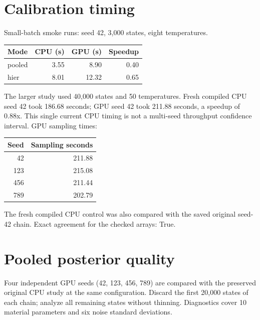 \documentclass[11pt]{article}
\begin{document}
\section*{Calibration timing}
Small-batch smoke runs: seed 42, 3,000 states, eight temperatures.
\begin{center}\begin{tabular}{lrrr}\toprule
Mode & CPU (s) & GPU (s) & Speedup\\\midrule
pooled & 3.55 & 8.90 & 0.40\\
hier & 8.01 & 12.32 & 0.65\\
\bottomrule\end{tabular}\end{center}
The larger study used 40,000 states and 50 temperatures. Fresh compiled CPU
seed 42 took 186.68 seconds; GPU seed 42 took 211.88 seconds,
a speedup of 0.88x. This single current CPU timing is not a multi-seed
throughput confidence interval. GPU sampling times:
\begin{center}\begin{tabular}{rr}\toprule
Seed & Sampling seconds\\\midrule
42 & 211.88\\
123 & 215.08\\
456 & 211.44\\
789 & 202.79\\
\bottomrule\end{tabular}\end{center}
The fresh compiled CPU control was also compared with the saved original seed-42
chain. Exact agreement for the checked arrays: True.
\section*{Pooled posterior quality}
Four independent GPU seeds (42, 123, 456, 789) are compared with the preserved
original CPU study at the same configuration. Discard the first 20,000 states
of each chain; analyze all remaining states without thinning. Diagnostics cover
10 material parameters and six noise standard deviations.
\end{document}
